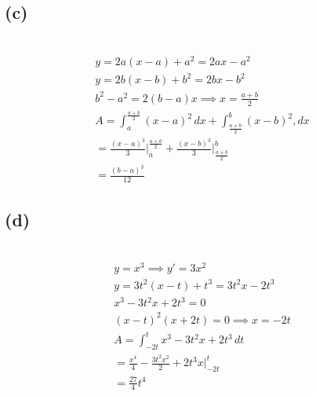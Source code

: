 \documentclass[12pt]{article}
\newcommand{\subproblem}[1]{\subsection{(#1)} \,}
\begin{document}
\subproblem{c}
\begin{gather*}
    y=2a(x-a)+a^2=2ax-a^2\\
    y=2b(x-b)+b^2=2bx-b^2\\
    b^2-a^2=2(b-a)x \implies x=\frac{a+b}{2}\\
    A= \int_a^\frac{a+b}{2} (x-a)^2\, dx + \int_\frac{a+b}{2}^b (x-b)^2, dx\\
    = \frac{(x-a)^3}{3} \Big|_a^\frac{a+b}{2} + \frac{(x-b)^3}{3} \Big|_\frac{a+b}{2}^b\\
    = \boxed{\frac{(b-a)^3}{12}}
\end{gather*}

\subproblem{d}
\begin{gather*}
    y=x^3 \implies y'=3x^2\\
    y=3t^2(x-t)+t^3 = 3t^2x - 2t^3\\
    x^3-3t^2x+2t^3=0\\
    (x-t)^2(x+2t)=0\implies \boxed{x=-2t}\\
    A=\int_{-2t}^t x^3-3t^2x+2t^3\, dt\\
    = \frac{x^4}{4} - \frac{3t^2x^2}{2} + 2t^3x \Big|_{-2t}^t\\
    = \boxed{\frac{27}{4}t^4}
\end{gather*}
\end{document}
